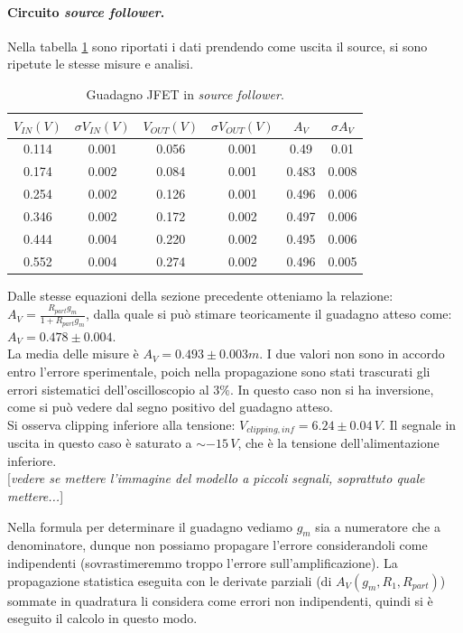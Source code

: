 \documentclass[10pt,a4paper]{article}
\newcommand{\rem}[1]{[\emph{#1}]}
\begin{document}
\paragraph{Circuito \emph{source follower}.}
Nella tabella \ref{tabellaSourceFollower} sono riportati i dati prendendo come uscita il source, si sono ripetute le stesse misure e analisi.

\begin{table}[!htb]\centering
\begin{tabular}{|c|c|c|c|c|c|}
\hline
$V_{IN} (V)$ & $\sigma V_{IN} (V)$ & $V_{OUT} (V)$ & $\sigma V_{OUT} (V)$ & $A_V$ & $\sigma A_V$\\
\hline
0.114 & 0.001 & 0.056 & 0.001 & 0.49 & 0.01\\
0.174 & 0.002 & 0.084 & 0.001 & 0.483 & 0.008\\
0.254 & 0.002 & 0.126 & 0.001 & 0.496 & 0.006\\
0.346 & 0.002 & 0.172 & 0.002 & 0.497 & 0.006\\
0.444 & 0.004 & 0.220 & 0.002 & 0.495 & 0.006\\
0.552 & 0.004 & 0.274 & 0.002 & 0.496 & 0.005\\
\hline
\end{tabular}
\caption{Guadagno JFET in \emph{source follower}.}
\label{tabellaSourceFollower}
\end{table}

Dalle stesse equazioni della sezione precedente otteniamo la relazione: $A_V = \frac{R_{part} g_m}{1+R_{part} g_m}$, dalla quale si può stimare teoricamente il guadagno atteso come: $A_V = 0.478\pm0.004$. \\
La media delle misure è $A_V = 0.493\pm0.003m$. I due valori non sono in accordo entro l'errore sperimentale, poich nella propagazione sono stati trascurati gli errori sistematici dell'oscilloscopio al $3\%$. In questo caso non si ha inversione, come si può vedere dal segno positivo del guadagno atteso.\\
Si osserva clipping inferiore alla tensione: $V_{clipping, inf} = 6.24\pm0.04\,V $. Il segnale in uscita in questo caso è saturato a $\sim -15\,V$, che è la tensione dell'alimentazione inferiore.\\
\rem{Spiegare perchè non si ha clipping superiore}

\rem{vedere se mettere l'immagine del modello a piccoli segnali, soprattuto quale mettere...}

Nella formula per determinare il guadagno vediamo $g_m$ sia a numeratore che a denominatore, dunque non possiamo propagare l'errore considerandoli come indipendenti (sovrastimeremmo troppo l'errore sull'amplificazione). La propagazione statistica eseguita con le derivate parziali (di $A_V(g_m, R_1, R_{part})$) sommate in quadratura li considera come errori non indipendenti, quindi si è eseguito il calcolo in questo modo.\\
\end{document}
